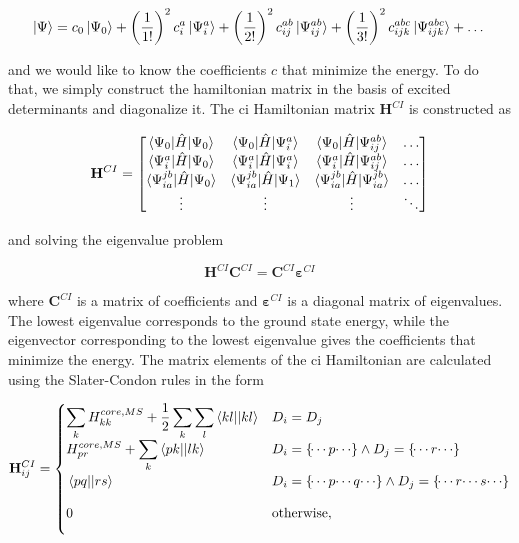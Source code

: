 \begin{equation}
\ket{\Psi}=c_0\ket{\Psi_0}+\left(\frac{1}{1!}\right)^2c_i^a\ket{\Psi_i^a}+\left(\frac{1}{2!}\right)^2c_{ij}^{ab}\ket{\Psi_{ij}^{ab}}+\left(\frac{1}{3!}\right)^2c_{ijk}^{abc}\ket{\Psi_{ijk}^{abc}}+\dots
\end{equation}

and we would like to know the coefficients \(c\) that minimize the energy. To do that, we simply construct the hamiltonian matrix in the basis of excited determinants and diagonalize it. The \acrshort{ci} Hamiltonian matrix \(\mathbf{H}^{CI}\) is constructed as

\begin{equation}\label{eq:ci-hamiltonian}
\mathbf{H}^{CI}=
\begin{bmatrix}
\braket{\Psi_0|\hat{H}|\Psi_0} & \braket{\Psi_0|\hat{H}|\Psi_i^a} & \braket{\Psi_0|\hat{H}|\Psi_{ij}^{ab}} & \dots \\
\braket{\Psi_i^a|\hat{H}|\Psi_0} & \braket{\Psi_i^a|\hat{H}|\Psi_i^a} & \braket{\Psi_i^a|\hat{H}|\Psi_{ij}^{ab}} & \dots \\
\braket{\Psi_{ia}^{jb}|\hat{H}|\Psi_0} & \braket{\Psi_{ia}^{jb}|\hat{H}|\Psi_1} & \braket{\Psi_{ia}^{jb}|\hat{H}|\Psi_{ia}^{jb}} & \dots \\
\vdots & \vdots & \vdots & \ddots
\end{bmatrix}
\end{equation}

and solving the eigenvalue problem

\begin{equation}\label{eq:ci-eigenvalue-problem}
\mathbf{H}^{CI}\mathbf{C}^{CI}=\mathbf{C}^{CI}\bm{\varepsilon}^{CI}
\end{equation}

where \(\mathbf{C}^{CI}\) is a matrix of coefficients and \(\bm{\varepsilon}^{CI}\) is a diagonal matrix of eigenvalues. The lowest eigenvalue corresponds to the ground state energy, while the eigenvector corresponding to the lowest eigenvalue gives the coefficients that minimize the energy. The matrix elements of the \acrshort{ci} Hamiltonian are calculated using the Slater-Condon rules in the form

\begin{equation}\label{eq:slater-condon-rules}
\mathbf{H}_{ij}^{CI}=
\begin{cases} 
\displaystyle \sum_kH_{kk}^{core,MS}+\frac{1}{2}\sum_k\sum_l\braket{kl||kl}&D_i=D_j \\
\displaystyle H_{pr}^{core,MS}+\sum_k\braket{pk||lk}&D_i=\left\lbrace\dotsi p\dotsi\right\rbrace\land D_j=\left\lbrace\dotsi r\dotsi\right\rbrace \\
\displaystyle \vphantom{\sum_k}\braket{pq||rs}&D_i=\left\lbrace\dotsi p\dotsi q\dotsi\right\rbrace\land D_j=\left\lbrace\dotsi r\dotsi s\dotsi\right\rbrace \\
\displaystyle \vphantom{\sum_k}0&\text{otherwise},
\end{cases}
\end{equation}

